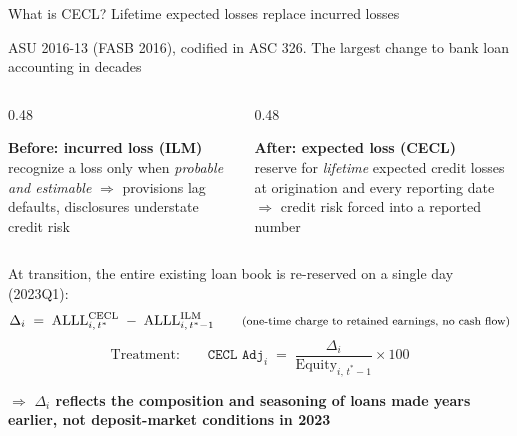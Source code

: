 \documentclass[aspectratio=169,10pt]{beamer}
\newcommand{\spec}[1]{{\vspace{-2mm}\textcolor{pgray}{\footnotesize #1}\par\vspace{1mm}}}
\newcommand{\takeaway}[1]{%
  \vfill
  {\centering\colorbox{pblue!8}{\parbox{0.94\textwidth}{\centering
    \textcolor{pblue}{$\Rightarrow$ \textbf{#1}}}}\par}}
\begin{document}
\begin{frame}{What is CECL? Lifetime expected losses replace incurred losses}
  \spec{ASU 2016-13 (FASB 2016), codified in ASC 326. The largest change to bank loan accounting in decades}
  \begin{columns}[T]
    \begin{column}{0.48\textwidth}
      {\centering\colorbox{pgray!15}{\parbox{0.95\linewidth}{\centering
        \textbf{Before: incurred loss (ILM)}\\[1mm]
        \footnotesize recognize a loss only when \emph{probable and
        estimable} $\Rightarrow$ provisions lag defaults, disclosures
        understate credit risk}}\par}
    \end{column}
    \begin{column}{0.48\textwidth}
      {\centering\colorbox{pblue!8}{\parbox{0.95\linewidth}{\centering
        \textbf{After: expected loss (CECL)}\\[1mm]
        \footnotesize reserve for \emph{lifetime} expected credit losses at
        origination and every reporting date $\Rightarrow$ credit risk forced
        into a reported number}}\par}
    \end{column}
  \end{columns}
  \vspace{2mm}
  At transition, the entire existing loan book is re-reserved on a single day (2023Q1):
  \[
    \Delta_i \;=\; \mathrm{ALLL}^{\mathrm{CECL}}_{i,\,t^*}
      \;-\; \mathrm{ALLL}^{\mathrm{ILM}}_{i,\,t^*-1}
    \qquad \text{\footnotesize (one-time charge to retained earnings,
      no cash flow)}
  \]
  \vspace{-2mm}
  \[
    \text{Treatment:}\qquad
    \texttt{CECL Adj}_i \;=\; \frac{\Delta_i}{\mathrm{Equity}_{i,\,t^*-1}}
      \times 100
  \]
  \takeaway{$\Delta_i$ reflects the composition and seasoning of loans made
    years earlier, not deposit-market conditions in 2023}
\end{frame}
\end{document}
